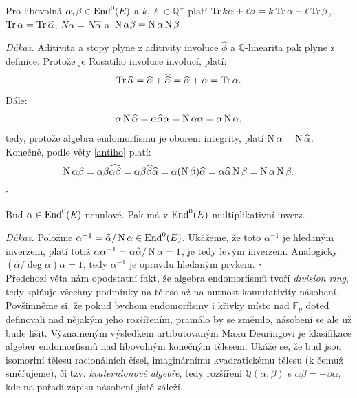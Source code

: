\documentclass [12pt]{report}
\begin{document}
\begin{veta}
Pro libovolná $\alpha,\beta \in \operatorname{End}^0 (E)$ a $k, \ell \in \mathbb{Q}^{+}$ platí $\operatorname{Tr} k\alpha + \ell \beta = k\operatorname{Tr} \alpha + \ell\operatorname{Tr} \beta$, $\operatorname{Tr} \alpha = \operatorname{Tr} \widehat{\alpha}$, $N \alpha = N \widehat{\alpha}$ a~$\operatorname{N} \alpha \beta = \operatorname{N} \alpha \operatorname{N} \beta$.
\end{veta}
\noindent \textit{Důkaz.} Aditivita a stopy plyne z aditivity involuce $\widehat{\phi}$ a $\mathbb{Q}$-linearita pak plyne z definice. Protože je Rosatiho involuce involucí, platí:
\begin{equation*}
\operatorname{Tr} \widehat{\alpha} = \widehat{\alpha} + \widehat{\widehat{\alpha}} = \widehat{\alpha} + \alpha = \operatorname{Tr} \alpha.
\end{equation*}
Dále:
\begin{equation*}
\alpha \operatorname{N} \widehat{\alpha} = \alpha \widehat{\alpha} \alpha = \operatorname{N} \alpha \alpha = \alpha \operatorname{N} \alpha,
\end{equation*} tedy, protože algebra endomorfismu je oborem integrity, platí $\operatorname{N} \alpha = \operatorname{N} \widehat{\alpha}$. Konečně, podle věty \ref{antiho} platí:
\begin{equation*}
\operatorname{N} \alpha \beta = \alpha \beta \widehat{\alpha \beta} = \alpha \beta \widehat{\beta} \widehat{\alpha} = \alpha (\operatorname{N} \beta) \widehat{\alpha} = \alpha \widehat{\alpha} \operatorname{N} \beta = \operatorname{N} \alpha \operatorname{N} \beta.
\end{equation*}
\hfill $\square$\\


\begin{dusledek}
Buď $\alpha \in \operatorname{End}^0 (E)$ nenulové. Pak má v $\operatorname{End}^0 (E)$ multiplikativní inverz.
\end{dusledek}
\noindent \textit{Důkaz.} Položme $\alpha^{-1} = \widehat{\alpha}/\operatorname{N} \alpha \in \operatorname{End}^0 (E)$. Ukážeme, že toto $\alpha^{-1}$ je hledaným inverzem, platí totiž $\alpha \alpha^{-1} = \alpha \widehat{\alpha} /\operatorname{N} \alpha = 1$, je tedy levým inverzem. Analogicky $(\widehat{\alpha}/\deg \alpha) \alpha =  1$, tedy $\alpha^{-1}$ je opravdu hledaným prvkem. \hfill $\square$\\

Předchozí věta nám opodstatní fakt, že algebra endomorfismů tvoří \textit{division ring}, tedy splňuje všechny podmínky na těleso až na nutnost komutativity násobení. Povšimněme si, že pokud bychom endomorfismy i křivky místo nad $\mathbb{F}_p$ doteď definovali nad nějakým jeho rozšířením, pramálo by se změnilo, násobení se ale už bude lišit. Význameným výsledkem artibutovaným Maxu Deuringovi \cite{Deuring} je klasifikace algeber endomorfismů nad libovolným konečným tělesem. Ukáže se, že buď jsou isomorfní tělesu racionálních čísel, imaginárnímu kvadratickému tělesu (k čemuž směřujeme), či tzv. \textit{kvaternionové algebře}, tedy rozšíření $\mathbb{Q}(\alpha,\beta)$ s $\alpha \beta = - \beta \alpha$, kde na pořadí zápisu násobení jistě záleží.
\end{document}
